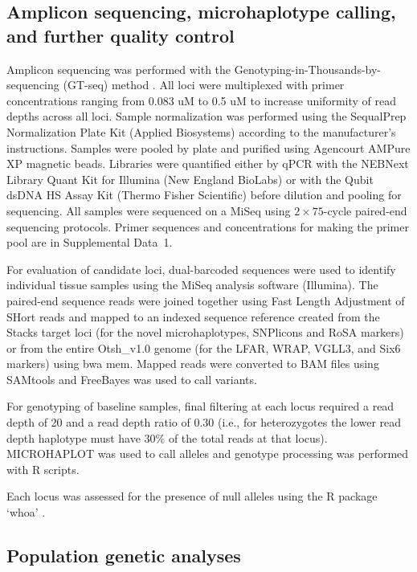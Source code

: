 \subsection*{Amplicon sequencing, microhaplotype calling, and further quality control}

Amplicon sequencing was performed with the Genotyping-in-Thousands-by-sequencing (GT-seq)
method \citep{campbell2015genotyping}. All loci were
multiplexed with primer concentrations ranging from 0.083 uM to 0.5 uM to increase
uniformity of read depths across all loci. Sample normalization was
performed using the SequalPrep Normalization Plate Kit (Applied Biosystems) according
to the manufacturer's instructions. Samples were pooled by plate
and purified using Agencourt AMPure XP magnetic beads.
Libraries were quantified either by qPCR with the NEBNext Library Quant Kit for Illumina (New
England BioLabs) or with the Qubit dsDNA HS Assay Kit (Thermo Fisher Scientific)
before dilution and pooling for sequencing.
All samples were sequenced on a MiSeq using $2\times 75$-cycle paired-end sequencing protocols.
Primer sequences and concentrations for making the primer pool are in Supplemental Data~1.

For evaluation of candidate loci, dual-barcoded sequences were used
to identify individual tissue samples using the MiSeq analysis software (Illumina).
The paired-end sequence reads were joined together using Fast Length Adjustment
of SHort reads \citep[FLASH:~][]{magovc2011flash} and mapped to an indexed sequence reference created from the Stacks target loci (for the novel microhaplotypes, SNPlicons and RoSA markers) or from the entire Otsh\_v1.0 genome
(for the LFAR, WRAP, VGLL3, and Six6 markers) using bwa mem. Mapped reads were converted to BAM files using SAMtools and FreeBayes was used to call variants.

For genotyping of baseline samples, final filtering at each locus required a read depth of 20 and a read depth ratio of 0.30 (i.e., for heterozygotes the lower read depth haplotype must have 30\% of the total reads at that locus). MICROHAPLOT was used to call alleles and genotype processing was performed with R scripts.

Each locus was assessed for the presence of null alleles using the R package `whoa'
\citep[\url{https://github.com/eriqande/whoa};  see][]{hendricks2018recent}.

\subsection*{Population genetic analyses}

